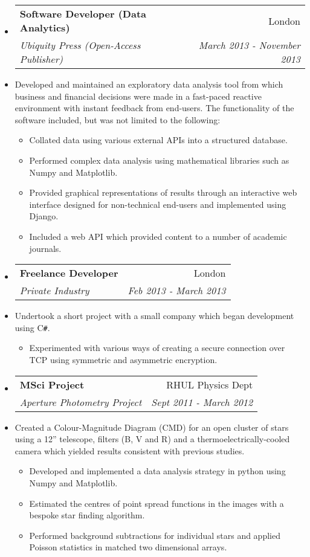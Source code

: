 \documentclass[letterpaper,11pt]{article}
\makeatletter
\newcommand{\resitem}[1]{\item #1 \vspace{-2pt}}
\newcommand{\ressubheading}[4]{
                \begin{tabular*}{180mm}{l@{\extracolsep{\fill}}r}
                \textbf{#1} & #2 \\
                \textit{#3} & \textit{#4} \\
                \end{tabular*}\vspace{-6pt}
}
\newcommand{\resdescription}[1]{#1 \vspace{-0mm}}
\makeatother
\begin{document}
\begin{itemize}
        \item[]
            \ressubheading{Software Developer (Data Analytics)}{London}{Ubiquity Press (Open-Access Publisher)}{March 2013 - November 2013}
        \item[]
            \resdescription{Developed and maintained an exploratory data analysis tool from which business and financial decisions were made in a fast-paced reactive environment with instant feedback from end-users. The functionality of the software included, but was not limited to the following:}
            \begin{itemize}
                    \resitem{Collated data using various external APIs into a structured database.}
                    \resitem{Performed complex data analysis using mathematical libraries such as Numpy and Matplotlib.}
                    \resitem{Provided graphical representations of results through an interactive web interface designed for non-technical end-users and implemented using Django.}
                    \resitem{Included a web API which provided content to a number of academic journals.}
            \end{itemize}

        \item[]
            \ressubheading{Freelance Developer}{London}{Private Industry}{Feb 2013 - March 2013}
        \item[]
            \resdescription{Undertook a short project with a small company which began development using C\texttt{\#}.}
            \begin{itemize}
                    \resitem{Experimented with various ways of creating a secure connection over TCP using symmetric and asymmetric encryption.}
            \end{itemize}

        \item[]
            \ressubheading{MSci Project}{RHUL Physics Dept}{Aperture Photometry Project}{Sept 2011 - March 2012}
        \item[]
            \resdescription{Created a Colour-Magnitude Diagram (CMD) for an open cluster of stars using a 12'' telescope, filters (B, V and R) and a thermoelectrically-cooled camera which yielded results consistent with previous studies.}
            \begin{itemize}
                    \resitem{Developed and implemented a data analysis strategy in python using Numpy and Matplotlib.}
                    \resitem{Estimated the centres of point spread functions in the images with a bespoke star finding algorithm.}
                    \resitem{Performed background subtractions for individual stars and applied Poisson statistics in matched two dimensional arrays.}
            \end{itemize}


\end{itemize}
\end{document}
